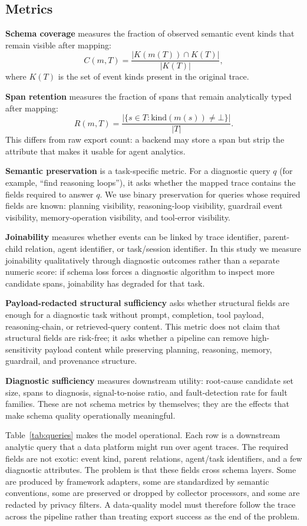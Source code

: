 \documentclass[conference]{IEEEtran}
\begin{document}
\subsection{Metrics}

\textbf{Schema coverage} measures the fraction of observed semantic
event kinds that remain visible after mapping:
\[
C(m,T) = \frac{|K(m(T)) \cap K(T)|}{|K(T)|},
\]
where $K(T)$ is the set of event kinds present in the original trace.

\textbf{Span retention} measures the fraction of spans that remain
analytically typed after mapping:
\[
R(m,T) = \frac{|\{s \in T : \mathrm{kind}(m(s)) \neq \bot\}|}{|T|}.
\]
This differs from raw export count: a backend may store a span but strip
the attribute that makes it usable for agent analytics.

\textbf{Semantic preservation} is a task-specific metric. For a
diagnostic query $q$ (for example, ``find reasoning loops''), it asks
whether the mapped trace contains the fields required to answer $q$. We
use binary preservation for queries whose required fields are known:
planning visibility, reasoning-loop visibility, guardrail event
visibility, memory-operation visibility, and tool-error visibility.

\textbf{Joinability} measures whether events can be linked by trace
identifier, parent-child relation, agent identifier, or task/session
identifier. In this study we measure joinability qualitatively through
diagnostic outcomes rather than a separate numeric score: if schema loss
forces a diagnostic algorithm to inspect more candidate spans,
joinability has degraded for that task.

\textbf{Payload-redacted structural sufficiency} asks whether structural
fields are enough for a diagnostic task without prompt, completion, tool
payload, reasoning-chain, or retrieved-query content. This metric does
not claim that structural fields are risk-free; it asks whether a
pipeline can remove high-sensitivity payload content while preserving
planning, reasoning, memory, guardrail, and provenance structure.

\textbf{Diagnostic sufficiency} measures downstream utility: root-cause
candidate set size, spans to diagnosis, signal-to-noise ratio, and
fault-detection rate for fault families. These are not schema metrics by
themselves; they are the effects that make schema quality operationally
meaningful.

Table~\ref{tab:queries} makes the model operational. Each row is a
downstream analytic query that a data platform might run over agent
traces. The required fields are not exotic: event kind, parent
relations, agent/task identifiers, and a few diagnostic attributes. The
problem is that these fields cross schema layers. Some are produced by
framework adapters, some are standardized by semantic conventions, some
are preserved or dropped by collector processors, and some are redacted
by privacy filters. A data-quality model must therefore follow the trace
across the pipeline rather than treating export success as the end of
the problem.
\end{document}
